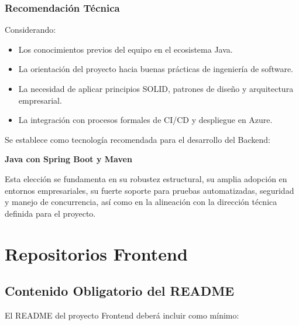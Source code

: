 \documentclass[12pt]{article}
\begin{document}

\subsubsection{Recomendación Técnica}

Considerando:

\begin{itemize}
    \item Los conocimientos previos del equipo en el ecosistema Java.
    \item La orientación del proyecto hacia buenas prácticas de ingeniería de software.
    \item La necesidad de aplicar principios SOLID, patrones de diseño y arquitectura empresarial.
    \item La integración con procesos formales de CI/CD y despliegue en Azure.
\end{itemize}

Se establece como tecnología recomendada para el desarrollo del Backend:

\begin{center}
\textbf{\Large Java con Spring Boot y Maven}
\end{center}

Esta elección se fundamenta en su robustez estructural, su amplia adopción en entornos empresariales, su fuerte soporte para pruebas automatizadas, seguridad y manejo de concurrencia, así como en la alineación con la dirección técnica definida para el proyecto.

\section{Repositorios Frontend}

\subsection{Contenido Obligatorio del README}

El README del proyecto Frontend deberá incluir como mínimo:
\end{document}
